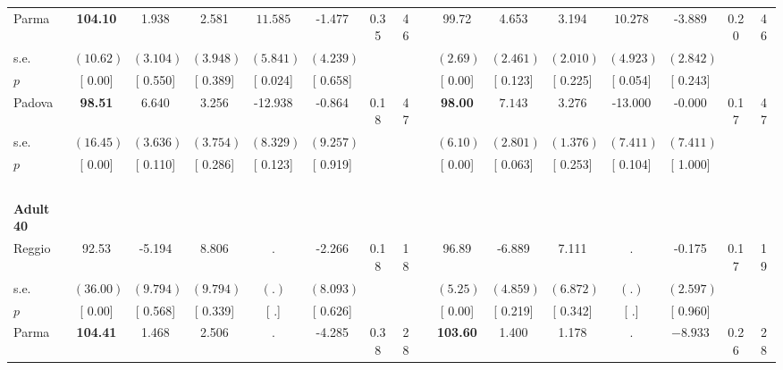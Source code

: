 \begin{longtable}{L{8em} c c c c c c c p{1em} c c c c c c c}
\quad \quad \quad Parma& \textbf{   104.10} &     1.938 &     2.581 & $ \mathbf{   11.585}$ &    -1.477 &      0.35 &        46 & & 99.72 &     4.653 &     3.194 & $ \mathbf{   10.278}$ &    -3.889 &      0.20 &        46  \\*
\quad \quad \quad \quad s.e.& $ (    10.62)$ & $ (    3.104)$ & $ (    3.948)$ & $ (    5.841)$ & $ (    4.239)$ & & & & $ (     2.69)$ & $ (    2.461)$ & $ (    2.010)$ & $ (    4.923)$ & $ (    2.842)$ & &  \\*
\quad \quad \quad \quad $ p$ & [     0.00] & [    0.550] & [    0.389] & [    0.024] & [    0.658] & & & & [     0.00] & [    0.123] & [    0.225] & [    0.054] & [    0.243] & &  \\[1em]
\quad \quad \quad Padova& \textbf{    98.51} &     6.640 &     3.256 &   -12.938 &    -0.864 &      0.18 &        47 & & \textbf{    98.00} & $ \mathbf{    7.143}$ &     3.276 &   -13.000 &    -0.000 &      0.17 &        47  \\*
\quad \quad \quad \quad s.e.& $ (    16.45)$ & $ (    3.636)$ & $ (    3.754)$ & $ (    8.329)$ & $ (    9.257)$ & & & & $ (     6.10)$ & $ (    2.801)$ & $ (    1.376)$ & $ (    7.411)$ & $ (    7.411)$ & &  \\*
\quad \quad \quad \quad $ p$ & [     0.00] & [    0.110] & [    0.286] & [    0.123] & [    0.919] & & & & [     0.00] & [    0.063] & [    0.253] & [    0.104] & [    1.000] & &  \\[1em]
~\\[1em]
\quad \quad \textbf{Adult 40} & & & & & & & & & & & & & & & \\* 
\quad \quad \quad Reggio& 92.53 &    -5.194 &     8.806 &         . &    -2.266 &      0.18 &        18 & & 96.89 &    -6.889 &     7.111 &         . &    -0.175 &      0.17 &        19  \\*
\quad \quad \quad \quad s.e.& $ (    36.00)$ & $ (    9.794)$ & $ (    9.794)$ & $ (        .)$ & $ (    8.093)$ & & & & $ (     5.25)$ & $ (    4.859)$ & $ (    6.872)$ & $ (        .)$ & $ (    2.597)$ & &  \\*
\quad \quad \quad \quad $ p$ & [     0.00] & [    0.568] & [    0.339] & [        .] & [    0.626] & & & & [     0.00] & [    0.219] & [    0.342] & [        .] & [    0.960] & &  \\[1em]
\quad \quad \quad Parma& \textbf{   104.41} &     1.468 &     2.506 &         . &    -4.285 &      0.38 &        28 & & \textbf{   103.60} &     1.400 &     1.178 &         . & $ \mathbf{   -8.933}$ &      0.26 &        28  \\*

\end{longtable}
